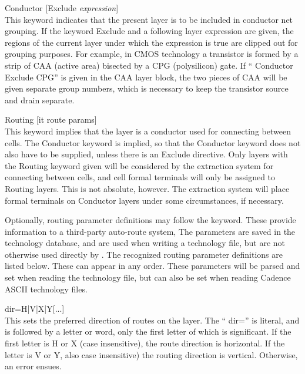 \begin{description}
\item{\et Conductor} [{\et Exclude} {\it expression\/}]\\
This keyword indicates that the present layer is to be included in
conductor net grouping.  If the keyword {\et Exclude} and a following
layer expression are given, the regions of the current layer under
which the expression is true are clipped out for grouping purposes. 
For example, in CMOS technology a transistor is formed by a strip of
CAA (active area) bisected by a CPG (polysilicon) gate.  If ``{\vt
Conductor Exclude CPG}'' is given in the CAA layer block, the two
pieces of CAA will be given separate group numbers, which is necessary
to keep the transistor source and drain separate.

\item{\et Routing} [{it route params\/}]\\
This keyword implies that the layer is a conductor used for connecting
between cells.  The {\et Conductor} keyword is implied, so that the
{\et Conductor} keyword does not also have to be supplied, unless
there is an {\et Exclude} directive.  Only layers with the {\et
Routing} keyword given will be considered by the extraction system for
connecting between cells, and cell formal terminals will only be
assigned to {\et Routing} layers.  This is not absolute, however.  The
extraction system will place formal terminals on {\et Conductor}
layers under some circumstances, if necessary.

Optionally, routing parameter definitions may follow the keyword. 
These provide information to a third-party auto-route system, The
parameters are saved in the {\Xic} technology database, and are used
when writing a technology file, but are not otherwise used directly by
{\Xic}.  The recognized routing parameter definitions are listed
below.  These can appear in any order.  These parameters will be
parsed and set when reading the technology file, but can also be set
when reading Cadence ASCII technology files.

\begin{description}
\item{\vt dir=H|V|X|Y}[...]\\
This sets the preferred direction of routes on the layer.  The ``{\vt
dir=}'' is literal, and is followed by a letter or word, only the
first letter of which is significant.  If the first letter is {\vt H}
or {\vt X} (case insensitive), the route direction is horizontal.  If
the letter is {\vt V} or {\vt Y}, also case insensitive) the routing
direction is vertical.  Otherwise, an error ensues.


\end{description}
\end{description}
